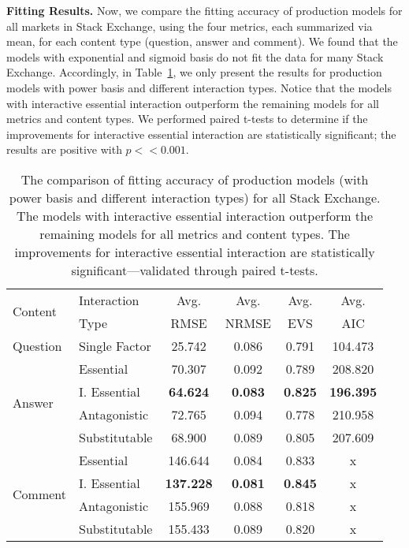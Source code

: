 \textbf{Fitting Results.} Now, we compare the fitting accuracy of production models for all markets in Stack Exchange, using the four metrics, each summarized via mean, for each content type (question, answer and comment). We found that the models with exponential and sigmoid basis do not fit the data for many Stack Exchange. Accordingly, in Table~\ref{tbl:model_fit}, we only present the results for production models with power basis and different interaction types. Notice that the models with interactive essential interaction outperform the remaining models for all metrics and content types. We performed paired t-tests to determine if the improvements for interactive essential interaction are statistically significant; the results are positive with $p<<0.001$.

\begin{table}[ht]
	\vspace{-0.5\baselineskip}
	\caption{The comparison of fitting accuracy of production models (with power basis and different interaction types) for all Stack Exchange. The models with interactive essential interaction outperform the remaining models for all metrics and content types. The improvements for interactive essential interaction are statistically significant---validated through paired t-tests.}
    \vspace{-\baselineskip}
	\label{tbl:model_fit}
	\begin{center}
	\begin{tabular}{llcccc}
    \toprule
    \multirow{2}{*}{Content} & Interaction & Avg. & Avg. & Avg. & Avg.\\
    & Type & RMSE & NRMSE & EVS & AIC\\
    \midrule
    Question & Single Factor & 25.742 & 0.086 & 0.791 & 104.473\\
    \midrule
    \multirow{4}{*}{Answer} & Essential & 70.307 & 0.092 & 0.789 & 208.820\\
    & I. Essential & \textbf{64.624} & \textbf{0.083} & \textbf{0.825} & \textbf{196.395}\\
    & Antagonistic & 72.765 & 0.094 &  0.778 & 210.958\\
    & Substitutable & 68.900 & 0.089 & 0.805 & 207.609\\
    \midrule
    \multirow{4}{*}{Comment} & Essential & 146.644 & 0.084 & 0.833 & x\\
    & I. Essential & \textbf{137.228} & \textbf{0.081} & \textbf{0.845} & x\\
    & Antagonistic & 155.969 & 0.088 &  0.818 & x\\
    & Substitutable & 155.433 & 0.089 & 0.820 & x\\
    \bottomrule
	\end{tabular}
	\end{center}
    \vspace{-\baselineskip}
\end{table}

